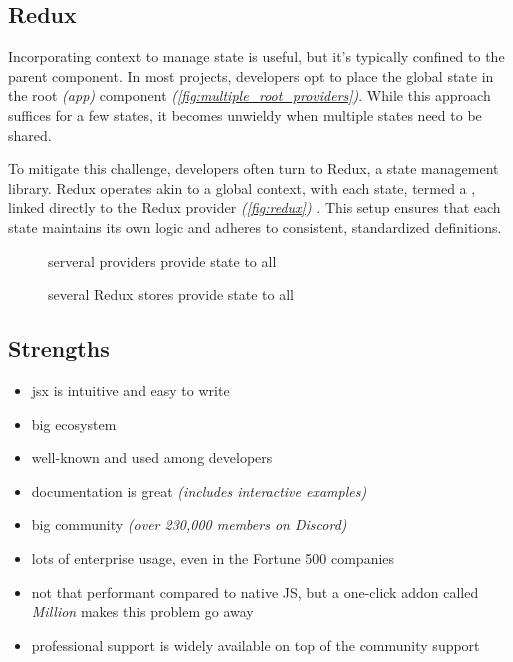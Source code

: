 \subsection{Redux}
\label{subsec:redux}

Incorporating context to manage state is useful, but it's typically confined to the parent component. In most projects, developers opt to place the global state in the root \textit{(app)} component \textit{(\autoref{fig:multiple_root_providers})}. While this approach suffices for a few states, it becomes unwieldy when multiple states need to be shared.

To mitigate this challenge, developers often turn to Redux, a state management library. Redux operates akin to a global context, with each state, termed a , linked directly to the Redux provider \textit{(\autoref{fig:redux})} \cite{redux:overview}. This setup ensures that each state maintains its own logic and adheres to consistent, standardized definitions.

\begin{figure}[ht]
    \centering
    \begin{minipage}[t]{0.3\textwidth}
        \centering
        
        \caption{serveral providers provide state to all}
        \label{fig:multiple_root_providers}
    \end{minipage}
    \hfill
    \begin{minipage}[t]{0.6\textwidth}
        \centering
        
        \caption{several Redux stores provide state to all}
        \label{fig:redux}
    \end{minipage}
\end{figure}

\subsection{Strengths}
\label{subsec:react:strengths}
\begin{itemize}
    \item \acrshort{jsx} is intuitive and easy to write
    \item big ecosystem
    \item well-known and used among developers
    \item documentation is great \textit{(includes interactive examples)}
    \item big community \textit{(over 230,000 members on Discord)}
    \item lots of enterprise usage, even in the Fortune 500 companies \cite{buildin:react_companies}
    \item not that performant compared to native JS, but a one-click addon called \textsl{Million} \cite{million} makes this problem go away
    \item professional support is widely available on top of the community support
\end{itemize}


